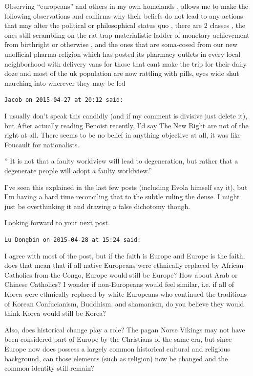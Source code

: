 \begin{footnotesize}
\begin{sffamily}
Observing ``europeans'' and others in my own homelands , allows me to make the following observations and confirms why their beliefs do not lead to any actions that may alter the political or philosophical status quo , there are 2 classes , the ones still scrambling on the rat-trap materialistic ladder of monetary achievement from birthright or otherwise , and the ones that are soma-cosed from our new unofficial pharma-religion which has posted its pharmacy outlets in every local neighborhood with delivery vans for those that cant make the trip for their daily doze and most of the uk population are now rattling with pills, eyes wide shut marching into wherever they may be led

\hfill

\texttt{Jacob on 2015-04-27 at 20:12 said:}

I usually don't speak this candidly (and if my comment is divisive just delete it), but After actually reading Benoist recently, I'd say The New Right are not of the right at all. There seems to be no belief in anything objective at all, it was like Foucault for nationalists.

'' It is not that a faulty worldview will lead to degeneration, but rather that a degenerate people will adopt a faulty worldview.''

I've seen this explained in the last few posts (including Evola himself say it), but I'm having a hard time reconciling that to the subtle ruling the dense. I might just be overthinking it and drawing a false dichotomy though.

Looking forward to your next post.

\hfill

\texttt{Lu Dongbin on 2015-04-28 at 15:24 said:}

I agree with most of the post, but if the faith is Europe and Europe is the faith, does that mean that if all native Europeans were ethnically replaced by African Catholics from the Congo, Europe would still be Europe? How about Arab or Chinese Catholics? I wonder if non-Europeans would feel similar, i.e. if all of Korea were ethnically replaced by white Europeans who continued the traditions of Korean Confucianism, Buddhism, and shamanism, do you believe they would think Korea would still be Korea?

Also, does historical change play a role? The pagan Norse Vikings may not have been considered part of Europe by the Christians of the same era, but since Europe now does possess a largely common historical cultural and religious background, can those elements (such as religion) now be changed and the common identity still remain?


\end{sffamily}
\end{footnotesize}
